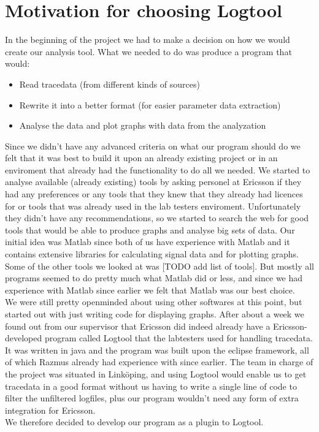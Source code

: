 \documentclass[cropmarks, frame, english]{idamasterthesis}
\begin{document}
\section{Motivation for choosing Logtool}
In the beginning of the project we had to make a decision on how we would create our analysis tool.
What we needed to do was produce a program that would:
\begin{itemize}
\item Read tracedata (from different kinds of sources)
\item Rewrite it into a better format (for easier parameter data extraction)
\item  Analyse the data and plot graphs with data from the analyzation
\end{itemize} 
Since we didn't have any advanced criteria on what our program should do we felt that it was best to build it upon an already existing project or in an enviroment that already had the functionality to do all we needed. \newline
We started to analyse available (already existing) tools by asking personel at Ericsson if they had any preferences or any tools that they knew that they already had licences for or tools that was already used in the lab testers enviroment. Unfortunately they didn't have any recommendations, so we started to search the web for good tools that would be able to produce graphs and analyse big sets of data. Our initial idea was Matlab since both of us have experience with Matlab and it contains extensive libraries for calculating signal data and for plotting graphs. Some of the other tools we looked at was [TODO add list of tools]. But mostly all programs seemed to do pretty much what Matlab did or less, and since we had experience with Matlab since earlier we felt that Matlab was our best choice. \\
We were still pretty openminded about using other softwares at this point, but started out with just writing code for displaying graphs. After about a week we found out from our supervisor that Ericsson did indeed already have a Ericsson-developed program called Logtool that the labtesters used for handling tracedata. It was written in java and the program was built upon the eclipse framework, all of which Razmus already had experience with since earlier. The team in charge of the project was situated in Linköping, and using Logtool would enable us to get tracedata in a good format without us having to write a single line of code to filter the unfiltered logfiles, plus our program wouldn't need any form of extra integration for Ericsson.\\
We therefore decided to develop our program as a plugin to Logtool. 
\end{document}
